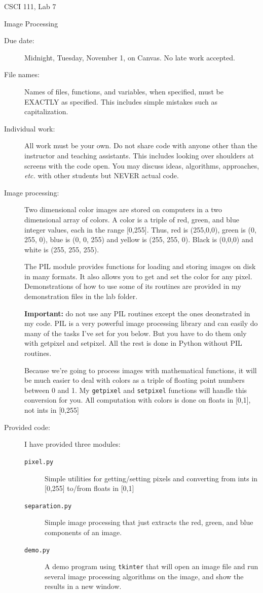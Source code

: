 \documentclass[12pt]{article}
\begin{document}
\sloppy
\centerline{\Large CSCI 111, Lab 7}
\centerline{\large Image Processing}

\begin{description}
\item[Due date:] Midnight, Tuesday, November 1, on Canvas.
No late work accepted.  

\item[File names:]  Names of files, functions, and variables, 
when specified,
must be EXACTLY as specified.  This includes simple mistakes such
as capitalization.

\item[Individual work:]  All work must be your own.  Do not share
code with anyone other than the instructor and teaching assistants.
This includes looking over shoulders at screens with the code open.
You may discuss ideas, algorithms, approaches, {\em etc.} with
other students but NEVER actual code.

\item[Image processing:]  Two dimensional color images are stored
on computers in a two dimensional array of colors.  A color is a 
triple of red, green, and blue integer values, each in the range [0,255].
Thus, red is (255,0,0), green is (0, 255, 0), blue is (0, 0, 255)
and yellow is (255, 255, 0).  Black is (0,0,0) and white is (255, 255, 255).

The PIL module provides functions for loading and storing images
on disk in many formats.  It also allows you to get  and
set the color for any pixel.  Demonstrations of how to use 
some of its routines are provided in my demonstration files
in the lab folder.

{\bf Important:} do not use any PIL routines except the ones
deonstrated in my code.  PIL is a very powerful image processing
library and can easily do many of the tasks I've set for you below.
But you have to do them only with getpixel and setpixel.  All the
rest is done in Python without PIL routines.

Because we're going to process images with mathematical functions,
it will be much easier to deal with colors as a triple of 
floating point numbers between 0 and 1.  My \lstinline{getpixel}
and \lstinline{setpixel} functions will handle this conversion
for you.  All computation with colors is done on floats in [0,1], not
ints in [0,255]

\item[Provided code:] I have provided three modules:
\begin{description}
\item[\tt pixel.py]  Simple utilities for getting/setting
pixels and converting from ints in [0,255] to/from floats
in [0,1]
\item[\tt separation.py] Simple image processing that
just extracts the red, green, and blue components of an image.
\item[\tt demo.py] A demo program using \lstinline{tkinter}
that will open an image file and run several image processing
algorithms on the image, and show the results in a new window.


\end{description}
\end{description}
\end{document}
